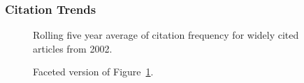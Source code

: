 \documentclass[
  10pt,
  letterpaper,
  DIV=11,
  numbers=noendperiod,
  twoside]{scrartcl}
\begin{document}
\subsubsection*{Citation Trends}\label{sec-trends-2002}

\begin{figure}


\caption{\label{fig-citation-spaghetti-2002}Rolling five year average of
citation frequency for widely cited articles from 2002.}

\end{figure}%

\begin{figure}


\caption{\label{fig-citation-facet-2002}Faceted version of
Figure~\ref{fig-citation-spaghetti-2002}.}

\end{figure}%
\end{document}
